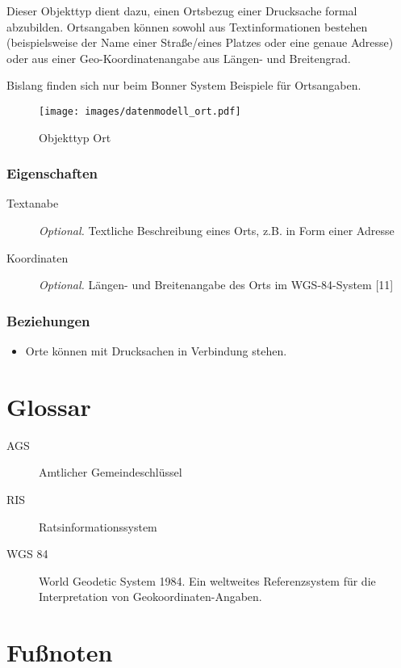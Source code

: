 \documentclass[,a4paper]{article}
\makeatletter
\def\maxwidth{\ifdim\Gin@nat@width>\linewidth\linewidth
\else\Gin@nat@width\fi}
\let\Oldincludegraphics\includegraphics
\renewcommand{\includegraphics}[1]{\Oldincludegraphics[width=\maxwidth]{#1}}
\makeatother
\begin{document}
Dieser Objekttyp dient dazu, einen Ortsbezug einer Drucksache formal
abzubilden. Ortsangaben können sowohl aus Textinformationen bestehen
(beispielsweise der Name einer Straße/eines Platzes oder eine genaue
Adresse) oder aus einer Geo-Koordinatenangabe aus Längen- und
Breitengrad.

Bislang finden sich nur beim Bonner System Beispiele für Ortsangaben.

\begin{figure}[htbp]
\centering
\texttt{[image: images/datenmodell\_ort.pdf]}
\caption{Objekttyp Ort}
\end{figure}

\subsubsection{Eigenschaften}

\begin{description}
\item[Textanabe]
\emph{Optional.} Textliche Beschreibung eines Orts, z.B. in Form einer
Adresse
\item[Koordinaten]
\emph{Optional.} Längen- und Breitenangabe des Orts im WGS-84-System
{[}11{]}
\end{description}

\subsubsection{Beziehungen}

\begin{itemize}
\item
  Orte können mit Drucksachen in Verbindung stehen.
\end{itemize}

\section{Glossar}

\begin{description}
\item[AGS]
Amtlicher Gemeindeschlüssel
\item[RIS]
Ratsinformationssystem
\item[WGS 84]
World Geodetic System 1984. Ein weltweites Referenzsystem für die
Interpretation von Geokoordinaten-Angaben.
\end{description}

\section{Fußnoten}
\end{document}
